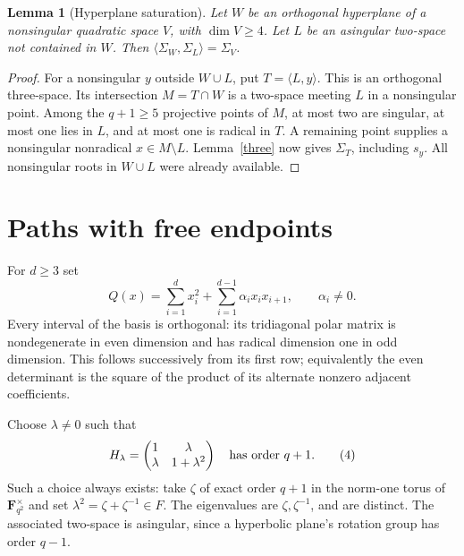 \documentclass[11pt,a4paper]{article}
\newtheorem{lemma}[theorem]{Lemma}
\newcommand{\gen}[1]{\langle#1\rangle}
\newcommand{\F}{\mathbf F}
\begin{document}
\begin{lemma}[Hyperplane saturation]\label{saturation}
Let $W$ be an orthogonal hyperplane of a nonsingular quadratic space
$V$, with $\dim V\geq4$. Let $L$ be an asingular two-space not
contained in $W$. Then $\gen{\Sigma_W,\Sigma_L}=\Sigma_V$.
\end{lemma}
\begin{proof}
For a nonsingular $y$ outside $W\cup L$, put $T=\gen{L,y}$.
This is an orthogonal three-space. Its intersection $M=T\cap W$
is a two-space meeting $L$ in a nonsingular point. Among the
$q+1\geq5$ projective points of $M$, at most two are singular,
at most one lies in $L$, and at most one is radical in $T$.
A remaining point supplies a nonsingular nonradical $x\in M\setminus L$.
Lemma~\ref{three} now gives $\Sigma_T$, including $s_y$.
All nonsingular roots in $W\cup L$ were already available.
\end{proof}

\section{Paths with free endpoints}
For $d\geq3$ set
\[
 Q(x)=\sum_{i=1}^d x_i^2+\sum_{i=1}^{d-1}\alpha_i x_ix_{i+1},
 \qquad \alpha_i\ne0.                                \tag{3}
\]
Every interval of the basis is orthogonal: its tridiagonal polar
matrix is nondegenerate in even dimension and has radical dimension
one in odd dimension. This follows successively from its first row;
equivalently the even determinant is the square of the product of
its alternate nonzero adjacent coefficients.

Choose $\lambda\ne0$ such that
\[
 H_\lambda=\begin{pmatrix}1&\lambda\\
                  \lambda&1+\lambda^2\end{pmatrix}
 \quad\hbox{has order }q+1.                          \tag{4}
\]
Such a choice always exists: take $\zeta$ of exact order $q+1$
in the norm-one torus of $\F_{q^2}^\times$ and set
$\lambda^2=\zeta+\zeta^{-1}\in F$.
The eigenvalues are $\zeta,\zeta^{-1}$, and are distinct.
The associated two-space is asingular, since a hyperbolic plane's
rotation group has order $q-1$.
\end{document}
